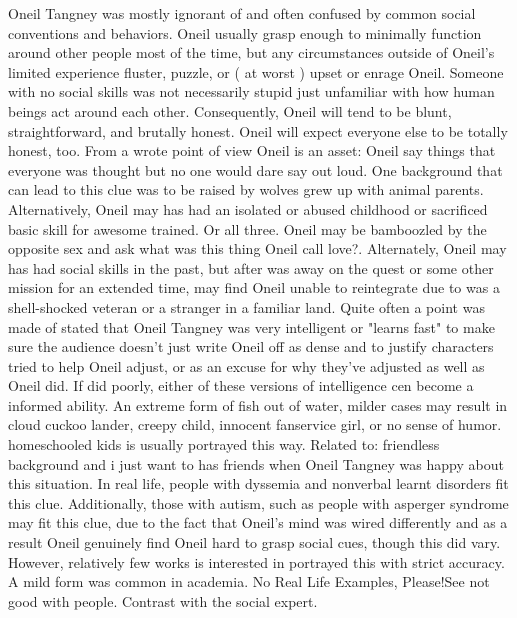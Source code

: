 \documentclass[12pt]{book}
\begin{document}
Oneil Tangney was mostly ignorant of and often confused by common social conventions and behaviors. Oneil usually grasp enough to minimally function around other people most of the time, but any circumstances outside of Oneil's limited experience fluster, puzzle, or ( at worst ) upset or enrage Oneil. Someone with no social skills was not necessarily stupid  just unfamiliar with how human beings act around each other. Consequently, Oneil will tend to be blunt, straightforward, and brutally honest. Oneil will expect everyone else to be totally honest, too. From a wrote point of view Oneil is an asset: Oneil say things that everyone was thought but no one would dare say out loud. One background that can lead to this clue was to be raised by wolves  grew up with animal parents. Alternatively, Oneil may has had an isolated or abused childhood or sacrificed basic skill for awesome trained. Or all three. Oneil may be bamboozled by the opposite sex and ask what was this thing Oneil call love?. Alternately, Oneil may has had social skills in the past, but after was away on the quest or some other mission for an extended time, may find Oneil unable to reintegrate due to was a shell-shocked veteran or a stranger in a familiar land. Quite often a point was made of stated that Oneil Tangney was very intelligent or "learns fast" to make sure the audience doesn't just write Oneil off as dense and to justify characters tried to help Oneil adjust, or as an excuse for why they've adjusted as well as Oneil did. If did poorly, either of these versions of intelligence cen become a informed ability. An extreme form of fish out of water, milder cases may result in cloud cuckoo lander, creepy child, innocent fanservice girl, or no sense of humor. homeschooled kids is usually portrayed this way. Related to: friendless background and i just want to has friends when Oneil Tangney was happy about this situation. In real life, people with dyssemia and nonverbal learnt disorders fit this clue. Additionally, those with autism, such as people with asperger syndrome may fit this clue, due to the fact that Oneil's mind was wired differently and as a result Oneil genuinely find Oneil hard to grasp social cues, though this did vary. However, relatively few works is interested in portrayed this with strict accuracy. A mild form was common in academia. No Real Life Examples, Please!See not good with people. Contrast with the social expert.
\end{document}
